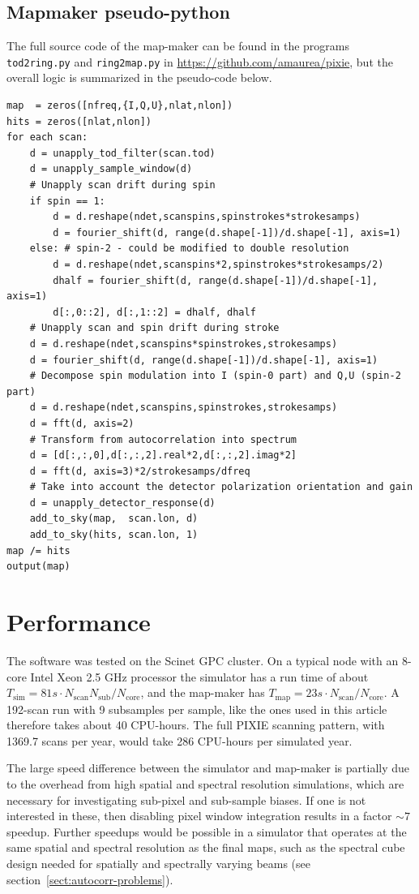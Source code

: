 \documentclass{article}
\begin{document}
\subsection{Mapmaker pseudo-python}
\label{sect:mapmaker}
The full source code of the map-maker can be found in the
programs \texttt{tod2ring.py} and \texttt{ring2map.py} in
\url{https://github.com/amaurea/pixie}, but the overall logic is summarized in
the pseudo-code below.
\begin{lstlisting}
map  = zeros([nfreq,{I,Q,U},nlat,nlon])
hits = zeros([nlat,nlon])
for each scan:
	d = unapply_tod_filter(scan.tod)
	d = unapply_sample_window(d)
	# Unapply scan drift during spin
	if spin == 1:
		d = d.reshape(ndet,scanspins,spinstrokes*strokesamps)
		d = fourier_shift(d, range(d.shape[-1])/d.shape[-1], axis=1)
	else: # spin-2 - could be modified to double resolution
		d = d.reshape(ndet,scanspins*2,spinstrokes*strokesamps/2)
		dhalf = fourier_shift(d, range(d.shape[-1])/d.shape[-1], axis=1)
		d[:,0::2], d[:,1::2] = dhalf, dhalf
	# Unapply scan and spin drift during stroke
	d = d.reshape(ndet,scanspins*spinstrokes,strokesamps)
	d = fourier_shift(d, range(d.shape[-1])/d.shape[-1], axis=1)
	# Decompose spin modulation into I (spin-0 part) and Q,U (spin-2 part)
	d = d.reshape(ndet,scanspins,spinstrokes,strokesamps)
	d = fft(d, axis=2)
	# Transform from autocorrelation into spectrum
	d = [d[:,:,0],d[:,:,2].real*2,d[:,:,2].imag*2]
	d = fft(d, axis=3)*2/strokesamps/dfreq
	# Take into account the detector polarization orientation and gain
	d = unapply_detector_response(d)
	add_to_sky(map,  scan.lon, d)
	add_to_sky(hits, scan.lon, 1)
map /= hits
output(map)
\end{lstlisting}

\section{Performance}
The software was tested on the Scinet GPC cluster. On a typical node
with an 8-core Intel Xeon 2.5 GHz processor the simulator has a run time of
about $T_\textrm{sim} = 81 s \cdot N_\textrm{scan} N_\textrm{sub} / N_\textrm{core}$,
and the map-maker has $T_\textrm{map} = 23 s \cdot N_\textrm{scan} / N_\textrm{core}$.
A 192-scan run with 9 subsamples per sample, like the ones used in this article
therefore takes about 40 CPU-hours. The full PIXIE scanning pattern, with 1369.7 scans
per year, would take 286 CPU-hours per simulated year.

The large speed difference between the simulator and map-maker is partially due to
the overhead from high spatial and spectral resolution simulations, which are necessary
for investigating sub-pixel and sub-sample biases. If one is not interested in
these, then disabling pixel window integration results in a factor $\sim 7$ speedup.
Further speedups would be possible in a simulator that operates at the same spatial
and spectral resolution as the final maps, such as the spectral cube design needed
for spatially and spectrally varying beams (see section~\ref{sect:autocorr-problems}).
\end{document}

